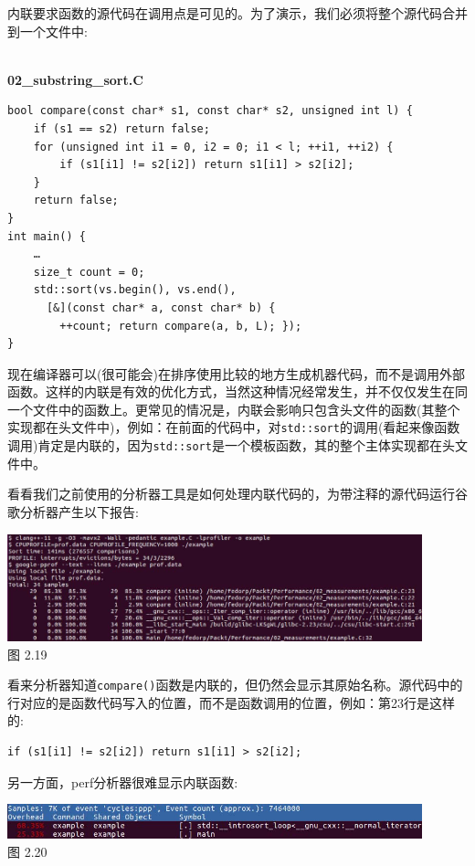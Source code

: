 内联要求函数的源代码在调用点是可见的。为了演示，我们必须将整个源代码合并到一个文件中:

\hspace*{\fill} \\ %
\noindent
\textbf{02\_substring\_sort.C}
\begin{lstlisting}[style=styleCXX]
bool compare(const char* s1, const char* s2, unsigned int l) {
	if (s1 == s2) return false;
	for (unsigned int i1 = 0, i2 = 0; i1 < l; ++i1, ++i2) {
		if (s1[i1] != s2[i2]) return s1[i1] > s2[i2];
	}
	return false;
}
int main() {
	…
	size_t count = 0;
	std::sort(vs.begin(), vs.end(),
	  [&](const char* a, const char* b) {
		++count; return compare(a, b, L); });
}
\end{lstlisting}

现在编译器可以(很可能会)在排序使用比较的地方生成机器代码，而不是调用外部函数。这样的内联是有效的优化方式，当然这种情况经常发生，并不仅仅发生在同一个文件中的函数上。更常见的情况是，内联会影响只包含头文件的函数(其整个实现都在头文件中)，例如：在前面的代码中，对\texttt{std::sort}的调用(看起来像函数调用)肯定是内联的，因为\texttt{std::sort}是一个模板函数，其的整个主体实现都在头文件中。

看看我们之前使用的分析器工具是如何处理内联代码的，为带注释的源代码运行谷歌分析器产生以下报告:

\begin{center}
\includegraphics[width=0.9\textwidth]{content/1/chapter2/images/19.jpg}\\
图 2.19
\end{center}

看来分析器知道\texttt{compare()}函数是内联的，但仍然会显示其原始名称。源代码中的行对应的是函数代码写入的位置，而不是函数调用的位置，例如：第23行是这样的:

\begin{lstlisting}[style=styleCXX]
if (s1[i1] != s2[i2]) return s1[i1] > s2[i2];
\end{lstlisting}

另一方面，perf分析器很难显示内联函数:

\begin{center}
\includegraphics[width=0.9\textwidth]{content/1/chapter2/images/20.jpg}\\
图 2.20
\end{center}

